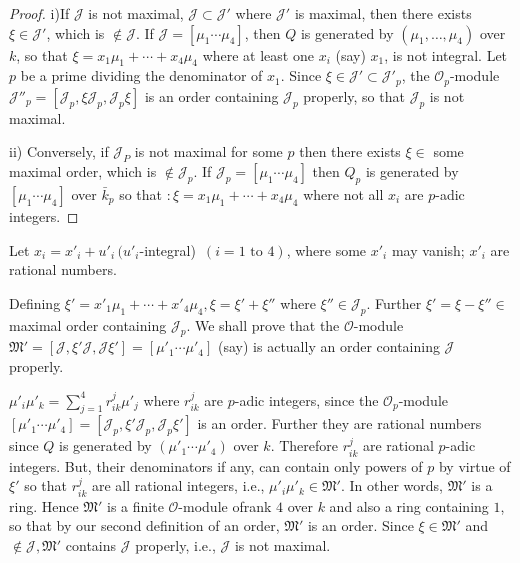 \begin{proof}
  i)\pageoriginale If $\mathcal{J}$ is not maximal, $\mathcal{J} \subset
  \mathcal{J}'$ where $\mathcal{J}'$ is maximal, then there exists
  $\xi \in \mathcal{J}'$, which is $\notin \mathcal{J}$. If
  $\mathcal{J} = [\mu_1 \cdots \mu_4]$, then $Q$ is generated by
  $(\mu_1,  \ldots,  \mu_4)$ over $k$, so that $\xi = x_1 \mu_1 +
  \cdots + x_4 \mu_4$ where at least one $x_i$ (say) $x_1$, is not
  integral. Let $p$ be a prime dividing the denominator of
  $x_1$. Since $\xi \in \mathcal{J}' \subset \mathcal{J}'_p$, the
  $\mathscr{O}_p$-module $\mathcal{J}''_p = [\mathcal{J}_p, \xi
    \mathcal{J}_p,  \mathcal{J}_p \xi]$ is an order containing
  $\mathcal{J}_p$ properly, so that $\mathcal{J}_p$ is not maximal. 
  
  ii) Conversely, if $\mathcal{J}_P$ is not maximal for some $p$ then
  there exists $\xi \in$ some maximal order, which is $\notin
  \mathcal{J}_p$. If $\mathcal{J}_p = [\mu_1 \cdots \mu_4]$ then $Q_p$
  is generated by $[\mu_1 \cdots \mu_4]$ over $\bar{k}_p$ so that $:
  \xi = x_1\mu_1 + \cdots + x_4 \mu_4$ where not all $x_i$ are $p$-adic
  integers. 
\end{proof}

Let $x_i = x'_i + u'_i \,(u'_i$-integral)\, $(i = 1 \text{ to }  4)$,
where some $x'_i$ may vanish; $x'_i$ are rational numbers. 

Defining $\xi' = x'_1 \mu_1 + \cdots + x'_4 \mu_4,  \xi = \xi'
+\xi''$
where $\xi'' \in \mathcal{J}_p$. Further $\xi' = \xi - \xi'' \in
$ maximal order containing $\mathcal{J}_p$. We shall prove that the
$\mathscr{O}$-module $\mathfrak{M} '  = [ \mathcal{J}, \xi'
  \mathcal{J}, \mathcal{J} \xi' ] = [\mu'_1 \cdots \mu'_4]$ (say) is
actually an order containing $\mathcal{J}$ properly. 

$\mu'_i \mu'_k = \sum \limits^{4}_{j=1} r^j_{ik} \mu'_j$ where
$r^j_{ik}$ are $p$-adic integers, since the $\mathscr{O}_p$-module
$[\mu'_1 \cdots \mu'_4] = [\mathcal{J}_p, \xi' \mathcal{J}_p,
  \mathcal{J}_p \xi']$ is an order. Further they are rational numbers
since $Q$ is generated by $(\mu'_1 \cdots \mu'_4)$ over $k$. Therefore
$r^j_{ik}$ are rational $p$-adic integers. But, their denominators if
any, can contain only powers of $p$ by virtue of $\xi '$ so that
$r^j_{ik}$ are all rational integers, i.e., $\mu'_i \mu'_k \in
\mathfrak{M} '$. In other words, $\mathfrak{M}'$ is a ring. Hence
$\mathfrak{M}'$ is a finite $\mathscr{O}$-module of\pageoriginale rank $4$ over $k$
and also a ring containing $1$, so that by our second definition of an
order, $\mathfrak{M}'$ is an order. Since $\xi \in \mathfrak{M}'$ and
$\notin \mathcal{J}, \mathfrak{M}'$ contains $\mathcal{J}$ properly,
i.e., $\mathcal{J}$ is not maximal. 

